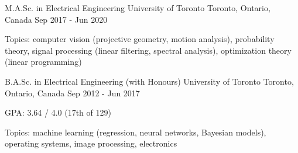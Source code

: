 

\begin{cventries}

	\cventry
		{M.A.Sc. in Electrical Engineering} %
    {University of Toronto} %
    {Toronto, Ontario, Canada} %
    {Sep 2017 - Jun 2020} %
    {
				\item{Topics: computer vision (projective geometry, motion analysis), probability theory, signal processing (linear filtering, spectral analysis), optimization theory (linear programming)}
		}

  \cventry
    {B.A.Sc. in Electrical Engineering (with Honours)} %
    {University of Toronto} %
    {Toronto, Ontario, Canada} %
    {Sep 2012 - Jun 2017} %
    {
      \begin{cvitems} %
				\item{GPA: 3.64 / 4.0 (17th of 129)}
				\item{Topics: machine learning (regression, neural networks, Bayesian models), operating systems, image processing, electronics}
			\end{cvitems}
    }

\end{cventries}
